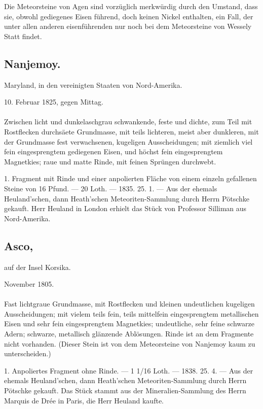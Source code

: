 \documentclass[a4paper, 11pt, oneside, polutonikogreek, german]{article}
\begin{document}
Die Meteorsteine von Agen sind vorzüglich merkwürdig durch den Umstand, dass sie, obwohl gediegenes Eisen führend, doch keinen Nickel enthalten, ein Fall, der unter allen anderen eisenführenden nur noch bei dem Meteorsteine von Wessely Statt findet.
\subsection{Nanjemoy.}
\begin{center}
\small
Maryland, in den vereinigten Staaten von Nord-Amerika.

10. Februar 1825, gegen Mittag.
\end{center}
\paragraph{}
Zwischen licht und dunkelaschgrau schwankende, feste und dichte, zum Teil mit Rostflecken durchsäete Grundmasse, mit teils lichteren, meist aber dunkleren, mit der Grundmasse fest verwachsenen, kugeligen Ausscheidungen; mit ziemlich viel fein eingesprengtem gediegenen Eisen, und höchst fein eingesprengtem Magnetkies; raue und matte Rinde, mit feinen Sprüngen durchwebt.

1. Fragment mit Rinde und einer anpolierten Fläche von einem einzeln gefallenen Steine von 16 Pfund. — 20 Loth. — 1835. 25. 1. — Aus der ehemals Heuland'schen, dann Heath'schen Meteoriten-Sammlung durch Herrn Pötschke gekauft. Herr Heuland in London erhielt das Stück von Professor Silliman aus Nord-Amerika.
\subsection[Asco.]{Asco,}
\begin{center}
\small
auf der Insel Korsika.

November 1805.
\end{center}
\paragraph{}
Fast lichtgraue Grundmasse, mit Rostflecken und kleinen undeutlichen kugeligen Ausscheidungen; mit vielem teils fein, teils mittelfein eingesprengtem metallischen Eisen und sehr fein eingesprengtem Magnetkies; undeutliche, sehr feine schwarze Adern; schwarze, metallisch glänzende Ablösungen. Rinde ist an dem Fragmente nicht vorhanden. (Dieser Stein ist von dem Meteorsteine von Nanjemoy kaum zu unterscheiden.)

1. Anpoliertes Fragment ohne Rinde. — 1 1/16 Loth. — 1838. 25. 4. — Aus der ehemals Heuland'schen, dann Heath'schen Meteoriten-Sammlung durch Herrn Pötschke gekauft. Das Stück stammt aus der Mineralien-Sammlung des Herrn Marquis de Drée in Paris, die Herr Heuland kaufte.
\end{document}
